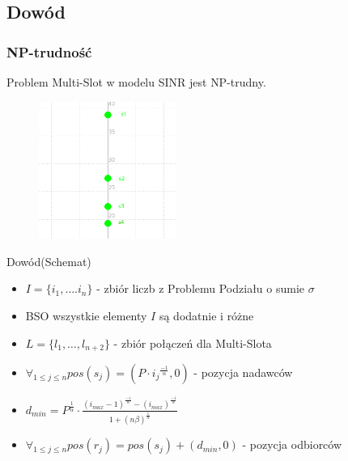 \documentclass[polish, t,10pt]{beamer}
\begin{document}
\subsection{Dowód}
\begin{frame}
    \frametitle{NP-trudność}
    \begin{theorem}
        Problem Multi-Slot w modelu SINR jest NP-trudny.
    \end{theorem}
    \begin{figure}
        \includegraphics[width=0.4\textwidth]{pictures/np-placement1.png}
    \end{figure}
    \begin{block}{Dowód(Schemat)}
        \begin{itemize}
            \item $I = \{i_1, \ldots. i_n\}$ - zbiór liczb z Problemu Podziału o sumie $\sigma$
            \item BSO wszystkie elementy $I$ są dodatnie i różne %
            \item $L = \{l_1, \ldots, l_{n+2}\}$ - zbiór połączeń dla Multi-Slota
            \item $\forall_{1 \leq j \leq n} pos(s_j) = (P\cdot{i_j}^\frac{-1}{\alpha}, 0)$ - pozycja nadawców
            \item $d_{min} = P^\frac{1}{\alpha}\cdot\frac{(i_{max}-1)^\frac{-1}{\alpha}-(i_{max})^\frac{-1}{\alpha}}{1+(n\beta)^\frac{1}{\alpha}}$
            \item $\forall_{1 \leq j \leq n} pos(r_j) = pos(s_j) + (d_{min}, 0)$ - pozycja odbiorców
        \end{itemize}
    \end{block}
\end{frame}
\end{document}
